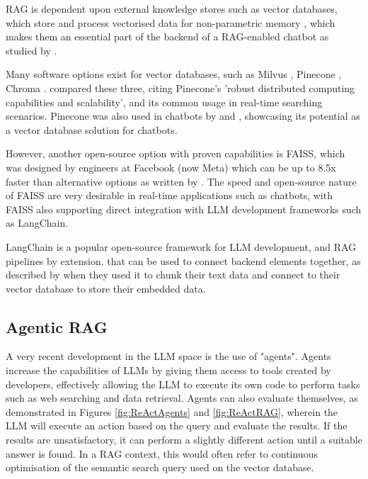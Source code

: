 RAG is dependent upon external knowledge stores such as vector databases, which store and process vectorised data
for non-parametric memory \autocite{li_modernization_2023}, which makes them an essential part of the backend of 
a RAG-enabled chatbot as studied by \textcite{odede_jaybot_2024}. 

Many software options exist for
vector databases, such as Milvus \autocite{wang_milvus_2021}, Pinecone \autocite{pinecone_pinecone_nodate}, Chroma \autocite{chroma_chroma_nodate}.
\textcite{xie_brief_2023} compared these three, citing Pinecone's 'robust distributed computing capabilities and scalability', and its common usage 
in real-time searching scenarios. Pinecone was also used in chatbots by \textcite{odede_jaybot_2024} and \textcite{singer_development_2024}, showcasing its potential 
as a vector database solution for chatbots.

However, another open-source option with proven capabilities is FAISS, which was designed by engineers at Facebook (now Meta) which can be up to 8.5x faster than 
alternative options as written by \textcite{johnsonBillionscaleSimilaritySearch2017}. The speed and open-source nature of FAISS are very desirable in real-time 
applications such as chatbots, with FAISS also supporting direct integration with LLM development frameworks such as LangChain.

LangChain \autocite{langchain_introduction_nodate} is a popular open-source framework for LLM development, and RAG pipelines by extension. that can be used to connect backend elements 
together, as described by \textcite{singer_development_2024} when they used it to chunk their text data and connect to their vector database to store 
their embedded data. 


\subsection{Agentic RAG}
A very recent development in the LLM space is the use of "agents". Agents increase the capabilities of LLMs by giving them 
access to tools created by developers, effectively allowing the LLM to execute its own code to perform tasks such as web searching 
and data retrieval. Agents can also evaluate themselves, as demonstrated in Figures \ref{fig:ReActAgents} and \ref{fig:ReActRAG}, 
wherein the LLM will execute an action based on the query and evaluate the results. If the results are unsatisfactory, it can perform a slightly 
different action until a suitable answer is found. In a RAG context, this would often refer to continuous optimisation of the semantic search query 
used on the vector database.

